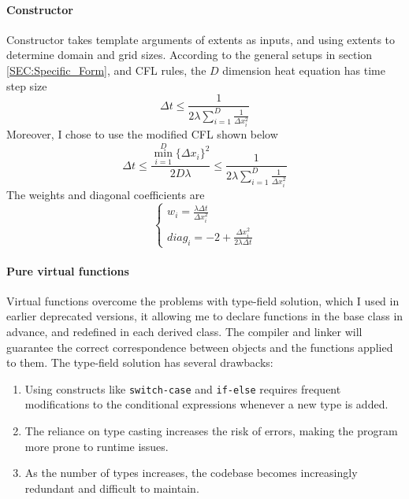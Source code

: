 \paragraph{Constructor} 
Constructor takes template arguments of extents as inputs, and using extents to determine domain and grid sizes.
According to the general setups in section \ref{SEC:Specific_Form}, and CFL rules, the $D$ dimension heat equation has time step size
\begin{equation}
  \Delta t \leqslant \frac{1}{ 
    \displaystyle 
    2 \lambda 
    \sum_{i=1}^{D} \frac{1}{\Delta x_i ^2}
  }
\end{equation}
Moreover, I chose to use the modified 
                                          CFL \cite{CFL} 
shown below 
\begin{equation}
  \Delta t 
  \leqslant 
  \frac{ \min_{i=1}^{D} \{\Delta x_i\}^2}{2 D\lambda}
  \leqslant 
  \frac{1}{ 
    \displaystyle 
    2 \lambda 
    \sum_{i=1}^{D} \frac{1}{\Delta x_i ^2}
  }
\end{equation}
The weights and diagonal coefficients are 
\begin{equation}
  \begin{cases}
    \displaystyle w_i = \frac{\lambda \Delta t}{\Delta x_i^2}               \\
    \displaystyle diag_i = -2 + \frac{\Delta x_i^2}{2\lambda\Delta t}
  \end{cases}
\end{equation}

\paragraph{Pure virtual functions }
Virtual functions overcome the problems with type-field solution, which I used in earlier deprecated versions, 
it allowing me to declare functions in the base class in advance, and redefined in each derived class.
The compiler and linker will guarantee the correct correspondence between objects and the functions applied to them.
The type-field solution has several drawbacks:
\begin{enumerate}
  \item Using constructs like \texttt{switch-case} and \texttt{if-else} requires frequent modifications to the conditional expressions whenever a new type is added.
  \item The reliance on type casting increases the risk of errors, making the program more prone to runtime issues.
  \item As the number of types increases, the codebase becomes increasingly redundant and difficult to maintain.
\end{enumerate}

